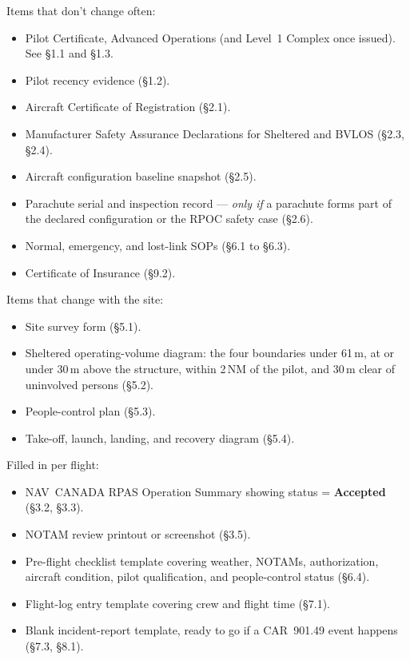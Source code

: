 \documentclass[11pt,letterpaper]{article}
\begin{document}
\begin{infobox}
Items that don't change often:
\begin{itemize}[leftmargin=1.4em, itemsep=1pt, topsep=2pt]
  \item Pilot Certificate, Advanced Operations (and Level~1 Complex
        once issued). See \S1.1 and \S1.3.
  \item Pilot recency evidence (\S1.2).
  \item Aircraft Certificate of Registration (\S2.1).
  \item Manufacturer Safety Assurance Declarations for Sheltered and
        BVLOS (\S2.3, \S2.4).
  \item Aircraft configuration baseline snapshot (\S2.5).
  \item Parachute serial and inspection record --- \emph{only if} a
        parachute forms part of the declared configuration or the RPOC
        safety case (\S2.6).
  \item Normal, emergency, and lost-link SOPs (\S6.1 to \S6.3).
  \item Certificate of Insurance (\S9.2).
\end{itemize}

Items that change with the site:
\begin{itemize}[leftmargin=1.4em, itemsep=1pt, topsep=2pt]
  \item Site survey form (\S5.1).
  \item Sheltered operating-volume diagram: the four boundaries
        under 61\,m, at or under 30\,m above the structure, within
        2\,NM of the pilot, and 30\,m clear of uninvolved persons
        (\S5.2).
  \item People-control plan (\S5.3).
  \item Take-off, launch, landing, and recovery diagram (\S5.4).
\end{itemize}

Filled in per flight:
\begin{itemize}[leftmargin=1.4em, itemsep=1pt, topsep=2pt]
  \item NAV~CANADA RPAS Operation Summary showing status = \textbf{Accepted}
        (\S3.2, \S3.3).
  \item NOTAM review printout or screenshot (\S3.5).
  \item Pre-flight checklist template covering weather, NOTAMs,
        authorization, aircraft condition, pilot qualification, and
        people-control status (\S6.4).
  \item Flight-log entry template covering crew and flight time (\S7.1).
  \item Blank incident-report template, ready to go if a CAR~901.49
        event happens (\S7.3, \S8.1).
\end{itemize}
\end{infobox}
\end{document}
